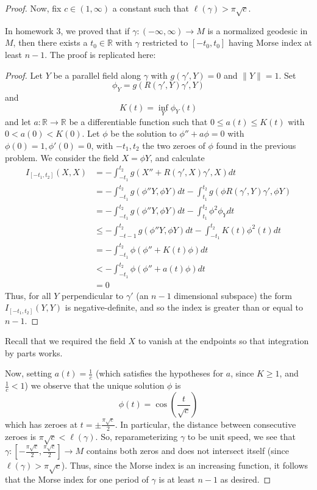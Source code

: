 \documentclass[fontsize=11pt]{scrartcl} %
\numberwithin{equation}{section} %
\numberwithin{figure}{section} %
\numberwithin{table}{section} %
\newcommand{\R}{\mathbb{R}}
\begin{document}
\begin{proof}
    Now, fix $c\in
    (1,\infty)$ a constant such that $\ell(\gamma)>\pi\sqrt{c}$.

    In homework 3, we proved that if $\gamma:(-\infty,\infty)\to M$ is a
    normalized geodesic in $M$, then there exists a $t_0\in \R$ with $\gamma$
    restricted to $[-t_0,t_0]$ having Morse index at least $n-1$. The proof is
    replicated here:

    \begin{proof}
    Let $Y$ be a parallel field along $\gamma$ with $g(\gamma',Y)=0$ and
    $\|Y\|=1$. Set
    \[
        \phi_Y = g(R(\gamma',Y)\gamma',Y)
    \]
    and
    \[
        K(t) = \inf_Y\phi_Y(t)
    \]
    and let $a:\R\to\R$ be a differentiable function such that $0\leq a(t)\leq
    K(t)$ with $0<a(0)<K(0)$. Let $\phi$ be the solution to $\phi'' + a\phi = 0$
    with $\phi(0)=1,\phi'(0)=0$, with $-t_1,t_2$ the two zeroes of $\phi$ found
    in the previous problem. We consider the field $X = \phi Y$, and calculate
    \[
        \begin{aligned}
            I_{[-t_1,t_2]}(X,X) &= -\int_{-t_1}^{t_2}g(X'' +
            R(\gamma',X)\gamma',X)dt\\
            &= -\int_{-t_1}^{t_2}g(\phi''Y,\phi Y)dt - \int_{t_1}^{t_2}g(\phi
            R(\gamma',Y)\gamma',\phi Y)\\
            &= -\int_{-t_1}^{t_2}g(\phi''Y,\phi Y)dt -
            \int_{t_1}^{t_2}\phi^2\phi_Ydt\\
            &\leq -\int_{-t-1}^{t_2}g(\phi''Y,\phi Y)dt -
            \int_{-t_1}^{t_2}K(t)\phi^2(t)dt\\
            &=-\int_{-t_1}^{t_2}\phi(\phi'' + K(t)\phi)dt\\
            &<-\int_{-t_1}^{t_2}\phi(\phi'' + a(t)\phi)dt\\
            &=0
        \end{aligned}
    \]
    Thus, for all $Y$ perpendicular to $\gamma'$ (an $n-1$ dimensional subspace)
    the form $I_{[-t_1,t_2]}(Y,Y)$ is negative-definite, and so the index is
    greater than or equal to $n-1$. 
\end{proof}
    Recall that we required the field $X$ to vanish at the endpoints so that
    integration by parts works.

    Now, setting $a(t) = \frac{1}{c}$ (which satisfies the hypotheses for $a$,
    since $K\geq 1$, and $\frac{1}{c}<1$) we observe that the unique solution
    $\phi$ is
    \[
    \phi(t) = \cos(\frac{t}{\sqrt{c}})
    \]
    which has zeroes at $t = \pm\frac{\pi\sqrt{c}}{2}$. In particular, the
    distance between consecutive zeroes is $\pi\sqrt{c}<\ell(\gamma)$. So,
    reparameterizing $\gamma$ to be unit speed, we see that
    $\gamma:[-\frac{\pi\sqrt{c}}{2},\frac{\pi\sqrt{c}}{2}]\to M$ contains both
    zeros and does not intersect itself (since $\ell(\gamma)>\pi\sqrt{c}$).
    Thus, since the Morse index is an increasing function, it follows that the
    Morse index for one period of $\gamma$ is at least $n-1$ as desired.
\end{proof}
\end{document}
